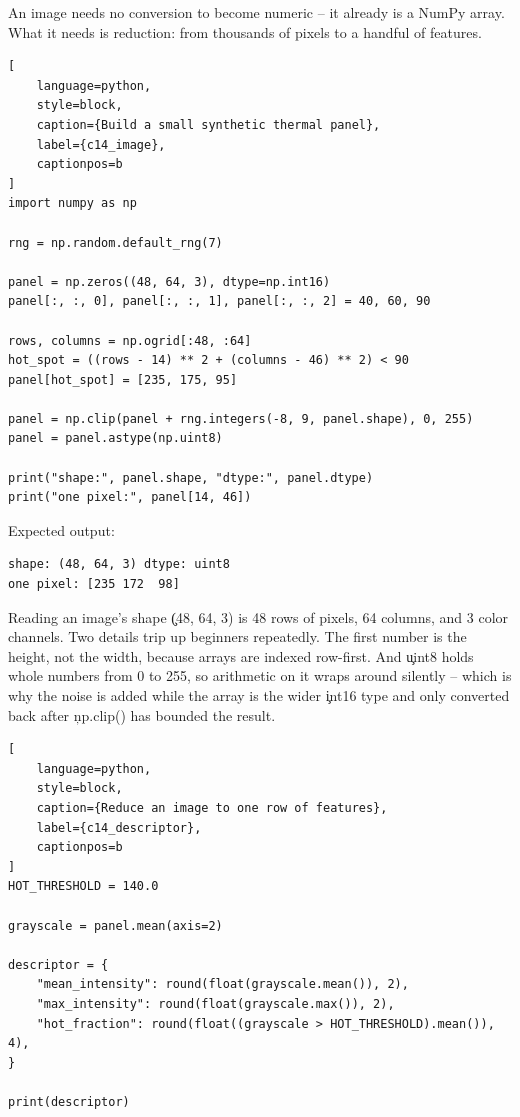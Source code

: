 
An image needs no conversion to become numeric -- it already is a NumPy array.
What it needs is reduction: from thousands of pixels to a handful of features.

\begin{lstlisting}[
    language=python,
    style=block,
    caption={Build a small synthetic thermal panel},
    label={c14_image},
    captionpos=b
]
import numpy as np

rng = np.random.default_rng(7)

panel = np.zeros((48, 64, 3), dtype=np.int16)
panel[:, :, 0], panel[:, :, 1], panel[:, :, 2] = 40, 60, 90

rows, columns = np.ogrid[:48, :64]
hot_spot = ((rows - 14) ** 2 + (columns - 46) ** 2) < 90
panel[hot_spot] = [235, 175, 95]

panel = np.clip(panel + rng.integers(-8, 9, panel.shape), 0, 255)
panel = panel.astype(np.uint8)

print("shape:", panel.shape, "dtype:", panel.dtype)
print("one pixel:", panel[14, 46])
\end{lstlisting}

Expected output:

\begin{lstlisting}[language=text, style=block, caption={Height, width, and three color channels}, label={c14_image_output}, captionpos=b]
shape: (48, 64, 3) dtype: uint8
one pixel: [235 172  98]
\end{lstlisting}

\begin{SyntaxBox}{Reading an image's shape}
\c{(48, 64, 3)} is 48 rows of pixels, 64 columns, and 3 color channels. Two
details trip up beginners repeatedly. The first number is the height, not the
width, because arrays are indexed row-first. And \c{uint8} holds whole numbers
from 0 to 255, so arithmetic on it wraps around silently -- which is why the
noise is added while the array is the wider \c{int16} type and only converted
back after \c{np.clip()} has bounded the result.
\end{SyntaxBox}

\begin{lstlisting}[
    language=python,
    style=block,
    caption={Reduce an image to one row of features},
    label={c14_descriptor},
    captionpos=b
]
HOT_THRESHOLD = 140.0

grayscale = panel.mean(axis=2)

descriptor = {
    "mean_intensity": round(float(grayscale.mean()), 2),
    "max_intensity": round(float(grayscale.max()), 2),
    "hot_fraction": round(float((grayscale > HOT_THRESHOLD).mean()), 4),
}

print(descriptor)
\end{lstlisting}

